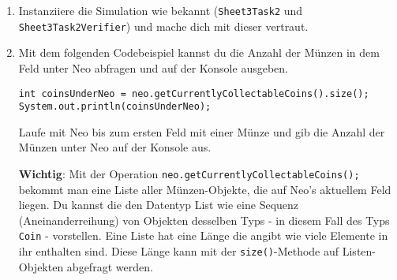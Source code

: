 
\begin{enumerate}
	\item
	Instanziiere die Simulation wie bekannt (\lstinline{Sheet3Task2} und \lstinline{Sheet3Task2Verifier}) und mache dich mit dieser vertraut.

	\item
		Mit dem folgenden Codebeispiel kannst du die Anzahl der Münzen in dem Feld unter Neo abfragen und auf der Konsole ausgeben.

		\begin{lstlisting}
int coinsUnderNeo = neo.getCurrentlyCollectableCoins().size();
System.out.println(coinsUnderNeo);
		\end{lstlisting}

		Laufe mit Neo bis zum ersten Feld mit einer Münze und gib die Anzahl der Münzen unter Neo auf der Konsole aus.\newline

		\textbf{Wichtig}: Mit der Operation \lstinline{neo.getCurrentlyCollectableCoins();} bekommt man eine Liste aller Münzen-Objekte, die auf Neo's aktuellem Feld liegen.
		Du kannst die den Datentyp List wie eine Sequenz (Aneinanderreihung) von Objekten desselben Typs - in diesem Fall des Typs \lstinline{Coin} - vorstellen.
		Eine Liste hat eine Länge die angibt wie viele Elemente in ihr enthalten sind.
		Diese Länge kann mit der \lstinline{size()}-Methode auf Listen-Objekten abgefragt werden.
\end{enumerate}


